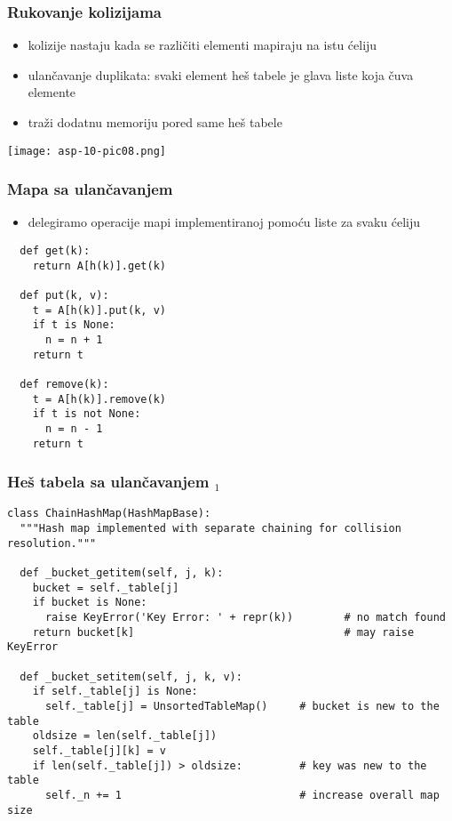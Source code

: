 \documentclass[compress]{beamer}
\begin{document}
\begin{frame}[fragile]
  \frametitle{Rukovanje kolizijama}
  \begin{itemize}
    \item kolizije nastaju kada se različiti elementi mapiraju na istu ćeliju
    \item ulančavanje duplikata: svaki element heš tabele je glava liste koja čuva elemente
    \item traži dodatnu memoriju pored same heš tabele
  \end{itemize}
  \begin{center}
    \texttt{[image: asp-10-pic08.png]}
  \end{center}
\end{frame}

\begin{frame}
  \frametitle{Mapa sa ulančavanjem}
  \begin{itemize}
    \item delegiramo operacije mapi implementiranoj pomoću liste za svaku ćeliju
  \end{itemize}
\begin{verbatim}
  def get(k):
    return A[h(k)].get(k)
  
  def put(k, v):
    t = A[h(k)].put(k, v)
    if t is None:
      n = n + 1
    return t
    
  def remove(k):
    t = A[h(k)].remove(k)
    if t is not None:
      n = n - 1
    return t
\end{verbatim}
\end{frame}

\begin{frame}[fragile,shrink=25]
  \frametitle{Heš tabela sa ulančavanjem $_1$}
\begin{verbatim}
class ChainHashMap(HashMapBase):
  """Hash map implemented with separate chaining for collision resolution."""

  def _bucket_getitem(self, j, k):
    bucket = self._table[j]
    if bucket is None:
      raise KeyError('Key Error: ' + repr(k))        # no match found
    return bucket[k]                                 # may raise KeyError

  def _bucket_setitem(self, j, k, v):
    if self._table[j] is None:
      self._table[j] = UnsortedTableMap()     # bucket is new to the table
    oldsize = len(self._table[j])
    self._table[j][k] = v
    if len(self._table[j]) > oldsize:         # key was new to the table
      self._n += 1                            # increase overall map size
\end{verbatim}
\end{frame}
\end{document}
